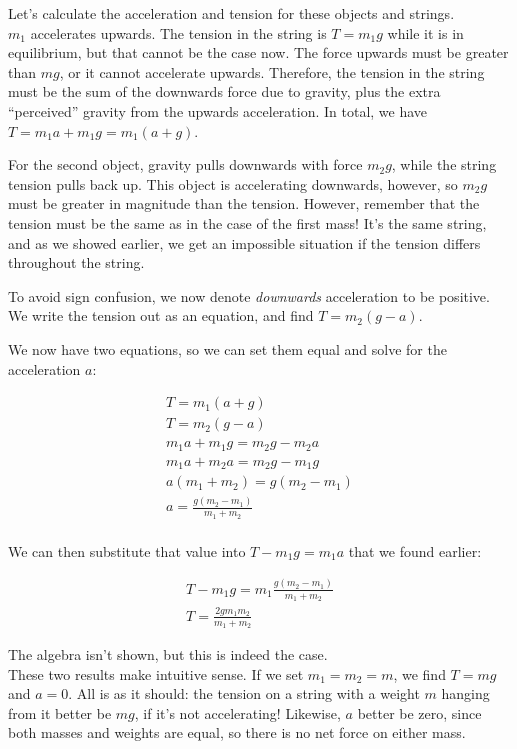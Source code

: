 \documentclass[8.01x]{subfiles}
\begin{document}
Let's calculate the acceleration and tension for these objects and strings.\\
$m_1$ accelerates upwards. The tension in the string is $T = m_1 g$ while it is in equilibrium, but that cannot be the case now. The force upwards must be greater than $m g$, or it cannot accelerate upwards. Therefore, the tension in the string must be the sum of the downwards force due to gravity, plus the extra ``perceived'' gravity from the upwards acceleration. In total, we have $T = m_1 a + m_1 g = m_1(a + g)$.

For the second object, gravity pulls downwards with force $m_2 g$, while the string tension pulls back up. This object is accelerating downwards, however, so $m_2 g$ must be greater in magnitude than the tension. However, remember that the tension must be the same as in the case of the first mass! It's the same string, and as we showed earlier, we get an impossible situation if the tension differs throughout the string.

To avoid sign confusion, we now denote \emph{downwards} acceleration to be positive. We write the tension out as an equation, and find $T = m_2 (g - a)$.

We now have two equations, so we can set them equal and solve for the acceleration $a$:

\begin{align}
T = m_1(a + g)\\
T = m_2(g - a)\\
m_1 a + m_1 g = m_2 g - m_2 a\\
m_1 a + m_2 a = m_2 g - m_1 g\\
a(m_1 + m_2) = g(m_2 - m_1)\\
a = \frac{g(m_2 - m_1)}{m_1 + m_2}\\
\end{align}

We can then substitute that value into $T - m_1 g = m_1 a$ that we found earlier:

\begin{align}
T - m_1 g = m_1  \frac{g(m_2 - m_1)}{m_1 + m_2}\\
T = \frac{2 g m_1 m_2}{m_1 + m_2}
\end{align}

The algebra isn't shown, but this is indeed the case.\\
These two results make intuitive sense. If we set $m_1 = m_2 = m$, we find $T = m g$ and $a = 0$. All is as it should: the tension on a string with a weight $m$ hanging from it better be $m g$, if it's not accelerating! Likewise, $a$ better be zero, since both masses and weights are equal, so there is no net force on either mass.
\end{document}
